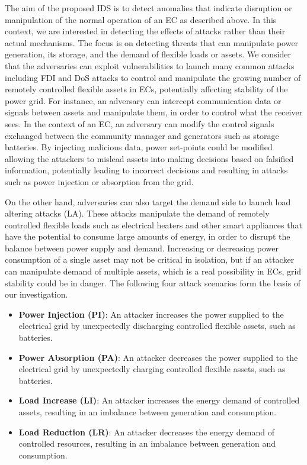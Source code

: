 The aim of the proposed IDS is to detect anomalies that indicate disruption or manipulation of the normal operation of an EC as described above. In this context, we are interested in detecting the effects of attacks rather than their actual mechanisms. The focus is on detecting threats that can manipulate power generation, its storage, and the demand of flexible loads or assets. We consider that the adversaries can exploit vulnerabilities to launch many common attacks including FDI and DoS attacks to control and manipulate the growing number of remotely controlled flexible assets in ECs, potentially affecting stability of the power grid. For instance, an adversary can intercept communication data or signals between assets and manipulate them, in order to control what the receiver sees. In the context of an EC, an adversary can modify the control signals exchanged between the community manager and generators such as storage batteries. By injecting malicious data, power set-points could be modified allowing the attackers to mislead assets into making decisions based on falsified information, potentially leading to incorrect decisions and resulting in attacks such as power injection or absorption from the grid.

On the other hand, adversaries can also target the demand side to launch load altering attacks (LA). These attacks manipulate the demand of remotely controlled flexible loads such as electrical heaters and other smart appliances that have the potential to consume large amounts of energy, in order to disrupt the balance between power supply and demand. Increasing or decreasing power consumption of a single asset may not be critical in isolation, but if an attacker can manipulate demand of multiple assets, which is a real possibility in ECs, grid stability could be in danger. The following four attack scenarios form the basis of our investigation.

\begin{itemize}
    \item \textbf{Power Injection (PI)}: An attacker increases the power supplied to the electrical grid by unexpectedly discharging controlled flexible assets, such as batteries.%
    \item \textbf{Power Absorption (PA)}: An attacker decreases the power supplied to the electrical grid by unexpectedly charging controlled flexible assets, such as batteries.%
    \item \textbf{Load Increase (LI)}: An attacker increases the energy demand of controlled assets, resulting in an imbalance between generation and consumption.%
    \item \textbf{Load Reduction (LR)}: An attacker decreases the energy demand of controlled resources, resulting in an imbalance between generation and consumption.%
\end{itemize}

